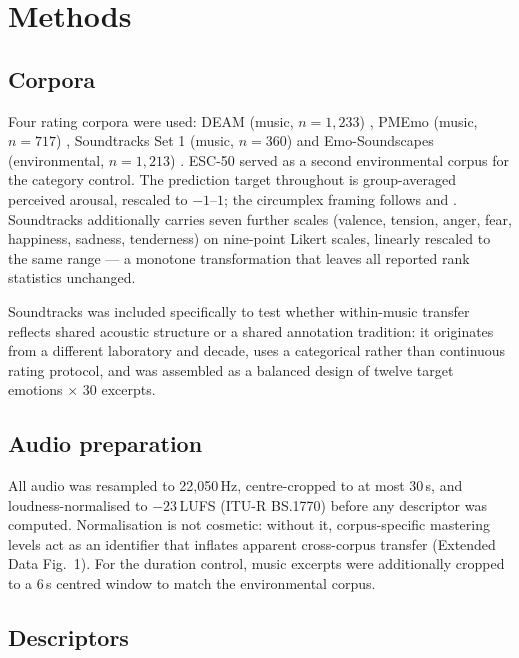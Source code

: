 \section*{Methods}

\subsection*{Corpora}

Four rating corpora were used: DEAM (music, $n = 1{,}233$) \citep{aljanaki2017},
PMEmo (music, $n = 717$) \citep{zhang2018pmemo}, Soundtracks Set 1 (music,
$n = 360$) \citep{eerola2011} and Emo-Soundscapes (environmental, $n = 1{,}213$)
\citep{fan2017emo}. ESC-50 \citep{piczak2015} served as a second environmental
corpus for the category control. The prediction target throughout is
group-averaged perceived arousal, rescaled to $-1$--$1$; the circumplex framing
follows \citet{russell1980} and \citet{eerola2013}. Soundtracks additionally
carries seven further scales (valence, tension, anger, fear, happiness, sadness,
tenderness) on nine-point Likert scales, linearly rescaled to the same range --- a
monotone transformation that leaves all reported rank statistics unchanged.

Soundtracks was included specifically to test whether within-music transfer
reflects shared acoustic structure or a shared annotation tradition: it originates
from a different laboratory and decade, uses a categorical rather than continuous
rating protocol, and was assembled as a balanced design of twelve target emotions
$\times$ 30 excerpts.

\subsection*{Audio preparation}

All audio was resampled to 22{,}050\,Hz, centre-cropped to at most 30\,s, and
loudness-normalised to $-23$\,LUFS (ITU-R BS.1770) before any descriptor was
computed. Normalisation is not cosmetic: without it, corpus-specific mastering
levels act as an identifier that inflates apparent cross-corpus transfer (Extended
Data Fig.~1). For the duration control, music excerpts were additionally cropped to
a 6\,s centred window to match the environmental corpus.

\subsection*{Descriptors}

